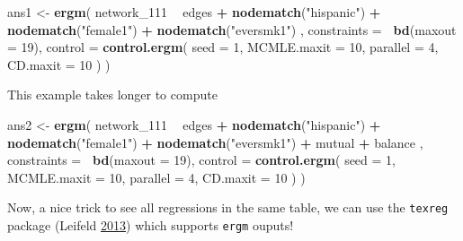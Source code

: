 \documentclass[]{book}
\newenvironment{Shaded}{\begin{snugshade}}{\end{snugshade}}
\newcommand{\DataTypeTok}[1]{\textcolor[rgb]{0.13,0.29,0.53}{#1}}
\newcommand{\DecValTok}[1]{\textcolor[rgb]{0.00,0.00,0.81}{#1}}
\newcommand{\KeywordTok}[1]{\textcolor[rgb]{0.13,0.29,0.53}{\textbf{#1}}}
\newcommand{\NormalTok}[1]{#1}
\newcommand{\OperatorTok}[1]{\textcolor[rgb]{0.81,0.36,0.00}{\textbf{#1}}}
\newcommand{\StringTok}[1]{\textcolor[rgb]{0.31,0.60,0.02}{#1}}
\begin{document}
\begin{Shaded}
\begin{Highlighting}[]
\NormalTok{ans1 <-}\StringTok{ }\KeywordTok{ergm}\NormalTok{(}
\NormalTok{  network_}\DecValTok{111} \OperatorTok{~}
\StringTok{    }\NormalTok{edges }\OperatorTok{+}
\StringTok{    }\KeywordTok{nodematch}\NormalTok{(}\StringTok{"hispanic"}\NormalTok{) }\OperatorTok{+}
\StringTok{    }\KeywordTok{nodematch}\NormalTok{(}\StringTok{"female1"}\NormalTok{) }\OperatorTok{+}
\StringTok{    }\KeywordTok{nodematch}\NormalTok{(}\StringTok{"eversmk1"}\NormalTok{)}
\NormalTok{    ,}
  \DataTypeTok{constraints =} \OperatorTok{~}\KeywordTok{bd}\NormalTok{(}\DataTypeTok{maxout =} \DecValTok{19}\NormalTok{),}
  \DataTypeTok{control =} \KeywordTok{control.ergm}\NormalTok{(}
    \DataTypeTok{seed        =} \DecValTok{1}\NormalTok{,}
    \DataTypeTok{MCMLE.maxit =} \DecValTok{10}\NormalTok{,}
    \DataTypeTok{parallel    =} \DecValTok{4}\NormalTok{,}
    \DataTypeTok{CD.maxit    =} \DecValTok{10}
\NormalTok{    )}
\NormalTok{  )}
\end{Highlighting}
\end{Shaded}

This example takes longer to compute

\begin{Shaded}
\begin{Highlighting}[]
\NormalTok{ans2 <-}\StringTok{ }\KeywordTok{ergm}\NormalTok{(}
\NormalTok{  network_}\DecValTok{111} \OperatorTok{~}
\StringTok{    }\NormalTok{edges }\OperatorTok{+}
\StringTok{    }\KeywordTok{nodematch}\NormalTok{(}\StringTok{"hispanic"}\NormalTok{) }\OperatorTok{+}
\StringTok{    }\KeywordTok{nodematch}\NormalTok{(}\StringTok{"female1"}\NormalTok{) }\OperatorTok{+}
\StringTok{    }\KeywordTok{nodematch}\NormalTok{(}\StringTok{"eversmk1"}\NormalTok{) }\OperatorTok{+}\StringTok{ }
\StringTok{    }\NormalTok{mutual }\OperatorTok{+}
\StringTok{    }\NormalTok{balance}
\NormalTok{    ,}
  \DataTypeTok{constraints =} \OperatorTok{~}\KeywordTok{bd}\NormalTok{(}\DataTypeTok{maxout =} \DecValTok{19}\NormalTok{),}
  \DataTypeTok{control =} \KeywordTok{control.ergm}\NormalTok{(}
    \DataTypeTok{seed        =} \DecValTok{1}\NormalTok{,}
    \DataTypeTok{MCMLE.maxit =} \DecValTok{10}\NormalTok{,}
    \DataTypeTok{parallel    =} \DecValTok{4}\NormalTok{,}
    \DataTypeTok{CD.maxit    =} \DecValTok{10}
\NormalTok{    )}
\NormalTok{  )}
\end{Highlighting}
\end{Shaded}

Now, a nice trick to see all regressions in the same table, we can use the \texttt{texreg} package (Leifeld \protect\hyperlink{ref-R-texreg}{2013}) which supports \texttt{ergm} ouputs!
\end{document}
